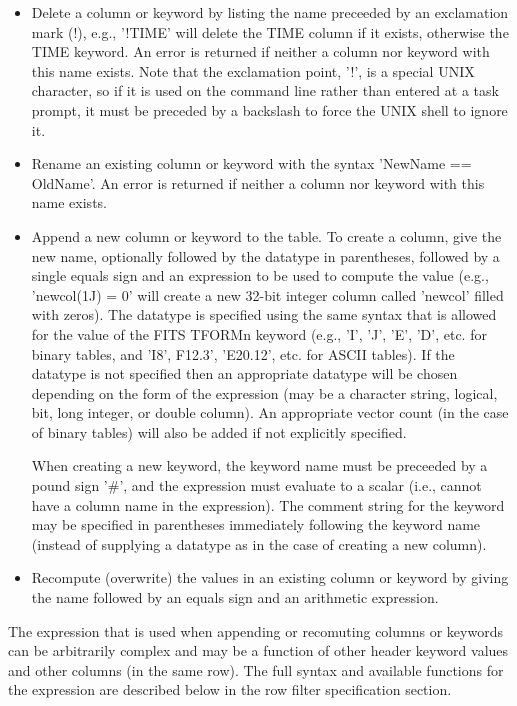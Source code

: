 \documentclass[11pt]{book}
\begin{document}
\begin{itemize}
\item
Delete a column or keyword by listing the name preceeded by an
exclamation mark (!), e.g., '!TIME' will delete the TIME column if it
exists, otherwise the TIME keyword.  An error is returned if neither a
column nor keyword with this name exists.  Note  that the exclamation
point,  '!', is a special UNIX character, so if it is used  on the
command line rather than entered at a task prompt, it must be  preceded
by a backslash to force the UNIX shell to ignore it.

\item
Rename an existing column or keyword with the syntax 'NewName ==
OldName'.  An error is returned if neither a column nor keyword with
this name exists.

\item
Append a new column or keyword to the table.  To create a column,
give the new name, optionally followed by the datatype in parentheses,
followed by a single equals sign and an  expression to be used to
compute the value (e.g., 'newcol(1J) = 0' will create a new 32-bit
integer column called 'newcol' filled with zeros).  The datatype is
specified using the same syntax that is allowed for the value of the
FITS TFORMn keyword (e.g., 'I', 'J', 'E', 'D', etc. for binary tables,
and 'I8', F12.3', 'E20.12', etc. for ASCII tables).  If the datatype is
not specified then an appropriate datatype will be chosen depending on
the form of the expression (may be a character string, logical, bit, long
integer, or double column). An appropriate vector count (in the case
of binary tables) will also be added if not explicitly specified.

When creating a new keyword, the keyword name must be preceeded by a
pound sign '\#', and the expression must evaluate to a scalar
(i.e., cannot have a column name in the expression).  The comment
string for the keyword may be specified in parentheses immediately
following the keyword name (instead of supplying a datatype as in
the case of creating a new column).

\item
Recompute (overwrite) the values in an existing column or keyword by
giving the name followed by an equals sign and an arithmetic
expression.
\end{itemize}

The expression that is used when appending or recomuting columns or
keywords can be arbitrarily complex and may be a function of other
header keyword values and other columns (in the same row).  The full
syntax and available functions for the expression are described below
in the row filter specification section.
\end{document}
